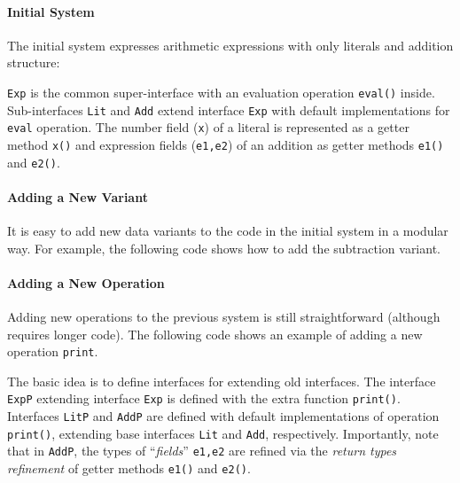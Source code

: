 \paragraph{Initial System}
The initial system expresses arithmetic expressions with only literals and
addition structure:


\texttt{Exp} is the common super-interface with an evaluation operation
\texttt{eval()} inside. Sub-interfaces \texttt{Lit} and \texttt{Add} extend
interface \texttt{Exp} with default implementations for \texttt{eval}
operation. The number field (\texttt{x}) of a literal is represented as a getter
method \texttt{x()} and expression fields (\texttt{e1,e2}) of an addition as
getter methods \texttt{e1()} and \texttt{e2()}.

\paragraph{Adding a New Variant}
It is easy to add new data variants to the code in the initial system in a
modular way. For example, the following code shows how to add the subtraction
variant.



\paragraph{Adding a New Operation}
Adding new operations to the previous system is still straightforward (although
requires longer code). The following code shows an example of adding a new
operation \texttt{print}.


The basic idea is to define interfaces for extending old interfaces.  The
interface \texttt{ExpP} extending interface \texttt{Exp} is defined with the
extra function \texttt{print()}. Interfaces \texttt{LitP} and \texttt{AddP} are
defined with default implementations of operation \texttt{print()}, extending
base interfaces \texttt{Lit} and \texttt{Add}, respectively. Importantly, note
that in \texttt{AddP}, the types of ``\emph{fields}'' \texttt{e1,e2} are refined
via the \emph{return types refinement} of getter methods \texttt{e1()} and
\texttt{e2()}.

